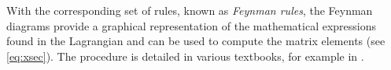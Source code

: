 With the corresponding set of rules, known as \emph{Feynman rules}, the Feynman diagrams provide a graphical representation of the mathematical expressions found in the Lagrangian and can be used to compute the matrix elements (see \cref{eq:xsec}). 
The procedure is detailed in various textbooks, for example in .

